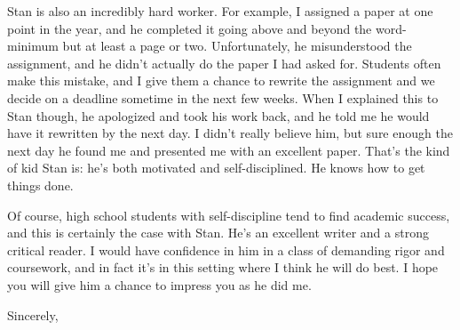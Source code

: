 \documentclass[11pt, letterpaper]{letter} %
\begin{document}
\begin{letter}
Stan is also an incredibly hard worker. For example, I assigned a paper at one point in the year, and he completed it going above and beyond the word-minimum but at least a page or two. Unfortunately, he misunderstood the assignment, and he didn't actually do the paper I had asked for. Students often make this mistake, and I give them a chance to rewrite the assignment and we decide on a deadline sometime in the next few weeks. When I explained this to Stan though, he apologized and took his work back, and he told me he would have it rewritten by the next day. I didn't really believe him, but sure enough the next day he found me and presented me with an excellent paper. That's the kind of kid Stan is: he's both motivated and self-disciplined. He knows how to get things done.

Of course, high school students with self-discipline tend to find academic success, and this is certainly the case with Stan. He's an excellent writer and a strong critical reader. I would have confidence in him in a class of demanding rigor and coursework, and in fact it's in this setting where I think he will do best. I hope you will give him a chance to impress you as he did me.

\closing{Sincerely,}




\end{letter}
\end{document}
